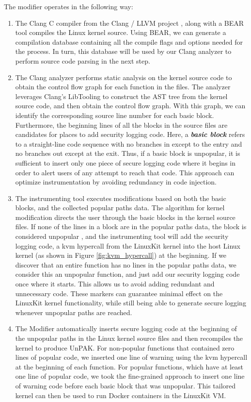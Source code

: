 The modifier operates in the following way: 
\begin{enumerate}
	\item The Clang C compiler from the Clang / LLVM project \cite{llvm}, along with a BEAR \cite{bear} tool compiles the Linux kernel source. Using BEAR, we can generate a compilation database containing all the compile flags and options needed for the process. In turn, this database will be used by our Clang analyzer to perform source code parsing in the next step.
	\item The Clang analyzer performs static analysis on the kernel source code to obtain the control flow graph for each function in the files. The analyzer leverages Clang's LibTooling \cite{clang-libtooling} to construct the AST tree from the kernel source code, and then obtain the control flow graph. With this graph, we can identify the corresponding source line number for each basic block. Furthermore, the beginning lines of all the blocks in the source files are candidates for places to add security logging code. Here, a \textbf{\textit{basic block}} refers to a straight-line code sequence with no branches in except to the entry and no branches out except at the exit. Thus, if a basic block is unpopular, it is sufficient to insert only one piece of secure logging code where it begins in order to alert users of any attempt to reach that code. This approach can optimize instrumentation by  avoiding redundancy in code injection. 
	\item The instrumenting tool executes modifications based on both the basic blocks, and the collected popular paths data. The algorithm for kernel modification directs the user through the basic blocks in the kernel source files. If none of the lines in a block are in the popular paths data, the block is considered unpopular , and the  instrumenting tool will add the security logging code,  a kvm hypercall from the LinuxKit kernel into the host Linux kernel (as shown in Figure \ref{fig:kvm_hypercall}) at the beginning. If we discover that an entire function has no lines in the popular paths data, we consider this an unpopular function, and just add our security logging code once where it starts. This allows us to avoid adding redundant and unnecessary code. These markers can guarantee minimal effect on the LinuxKit kernel functionality, while still being able to generate secure logging whenever unpopular paths are reached.  
	\item The Modifier automatically inserts secure logging code at the beginning of the unpopular paths in the Linux kernel source files and then recompiles the kernel to produce UnPAK. For non-popular functions that contained zero lines of popular code, we inserted one line of warning using the kvm hypercall at the beginning of each function. For popular functions, which have at least one line of popular code, we took the fine-grained approach to insert one line of warning code before each basic block that was unpopular. This tailored kernel can then be used to run Docker containers in the LinuxKit VM. 
\end{enumerate}

